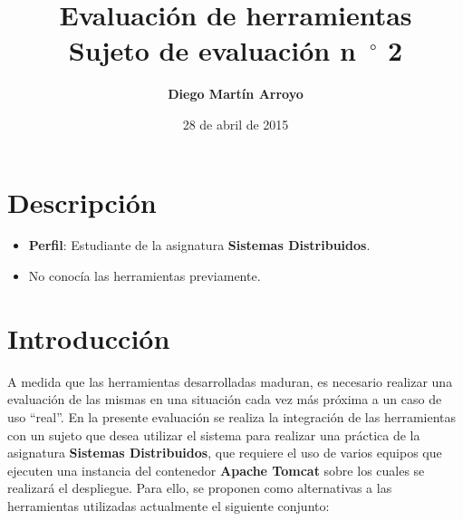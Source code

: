 

\newcommand{\hmwkTitle}{Evaluación de herramientas} %
\newcommand{\hmwkDueDate}{Martes,\ 28\ de\ April\ de\ 2015} %
\newcommand{\hmwkClassInstructor}{Rodrigo Santamaría} %
\newcommand{\hmwkAuthorName}{Diego Martín Arroyo} %
\newcommand{\hmwkSubject}{2} %


\title{\hmwkTitle\\Sujeto de evaluación n\hspace{-1.5mm}$\phantom{a}^{\circ}$ \hmwkSubject}
\author{\textbf{\hmwkAuthorName}}
\date{28 de abril de 2015} %


\maketitle

\tableofcontents
\section{Descripción}

\begin{itemize}
	\item \textbf{Perfil}: Estudiante de la asignatura \textbf{Sistemas Distribuidos}.
	\item No conocía las herramientas previamente.
\end{itemize}

\section{Introducción}

A medida que las herramientas desarrolladas maduran, es necesario realizar una evaluación de las mismas en una situación cada vez más próxima a un caso de uso ``real''. En la presente evaluación se realiza la integración de las herramientas con un sujeto que desea utilizar el sistema para realizar una práctica de la asignatura \textbf{Sistemas Distribuidos}, que requiere el uso de varios equipos que ejecuten una instancia del contenedor \textbf{Apache Tomcat} sobre los cuales se realizará el despliegue. Para ello, se proponen como alternativas a las herramientas utilizadas actualmente el siguiente conjunto:

